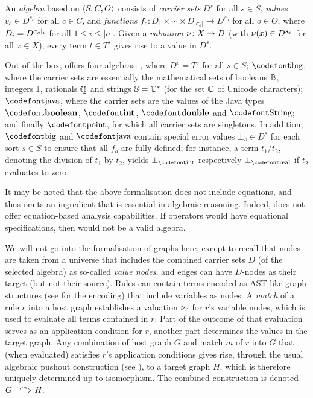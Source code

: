 An \emph{algebra} based on $\langle{S,C,O}\rangle$ consists of \emph{carrier sets} $D^s$ for all $s\in S$, \emph{values} $v_c\in D^{s_c}$ for all $c\in C$, and \emph{functions} $f_o\colon D_1\times\cdots \times D_{|\sigma_o|} \to D^{s_o}$ for all $o\in O$, where $D_i=D^{\sigma_o{|_{i}}}$ for all $1\leq i\leq |\sigma|$. Given a \emph{valuation} $\nu\colon X\to D$ (with $\nu(x)\in D^{s_x}$ for all $x\in X$), every term $t\in T^s$ gives rise to a value in $D^s$.

Out of the box, \GROOVE offers four algebras: \termA, where $D^s=T^s$ for all $s\in S$; $\bigA$, where the carrier sets are essentially the mathematical sets of booleans ${\mathbb{B}}$, integers ${\mathbb{I}}$, rationals ${\mathbb{Q}}$ and strings ${\mathbb{S}}={\mathbb{C}}^*$ (for the set  ${\mathbb{C}}$ of Unicode characters); $\javaA$, where the carrier sets are the values of the Java types $\boolT$, $\intT$, $\doubleT$ and $\stringT$; and finally $\pointA$, for which all carrier sets are singletons. In addition, $\bigA$ and $\javaA$ contain special error values $\bot_s\in D^s$ for each sort $s\in S$ to ensure that all $f_o$ are fully defined; for instance, a term $t_1/t_2$, denoting the division of $t_1$ by $t_2$, yields $\bot_\intS$ respectively $\bot_\realS$ if $t_2$ evaluates to zero.

\medskip\noindent
It may be noted that the above formalisation does not include equations, and thus omits an ingredient that is essential in algebraic reasoning. Indeed, \GROOVE does not offer equation-based analysis capabilities. If operators would have equational specifications, then \termA would not be a valid algebra.

\medskip\noindent
We will not go into the formalisation of \GROOVE graphs here, except to recall that nodes are taken from a universe that includes the combined carrier sets $D$ (of the selected algebra) as so-called \emph{value nodes}, and edges can have $D$-nodes as their target (but not their source). Rules can contain terms encoded as AST-like graph structures (see \cite{GROOVE-attributes} for the encoding) that include variables as nodes. A \emph{match} of a rule $r$ into a host graph establishes a valuation $\nu_r$ for $r$'s variable nodes, which is used to evaluate all terms contained in $r$. Part of the outcome of that evaluation serves as an application condition for $r$, another part determines the values in the target graph. Any combination of host graph $G$ and match $m$ of $r$ into $G$ that (when evaluated) satisfies $r$'s application conditions gives rise, through the usual algebraic pushout construction (see \cite{GT-book,Ehrig-attributes}), to a target graph $H$, which is therefore uniquely determined up to isomorphism. The combined construction is denoted $G\Trans{r,m} H$.

